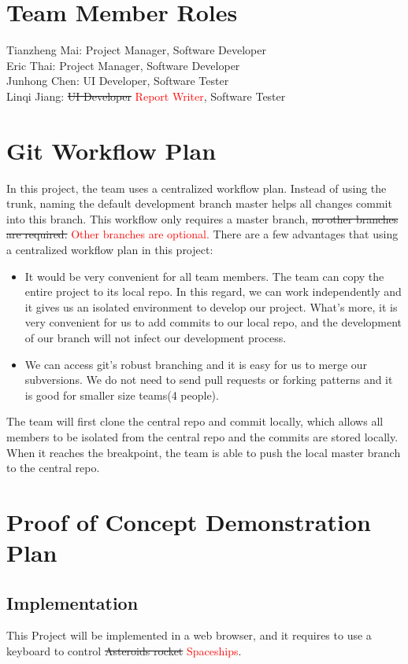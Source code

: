 \documentclass{article}
\begin{document}
\section{Team Member Roles}
Tianzheng Mai: Project Manager, Software Developer\\
Eric Thai: Project Manager, Software Developer\\
Junhong Chen: UI Developer, Software Tester\\
Linqi Jiang: \sout{UI Developer} \textcolor{red}{Report Writer}, Software Tester\\

\section{Git Workflow Plan}
In this project, the team uses a centralized workflow plan. Instead of using the trunk, naming the default development branch master helps all changes commit into this branch. This workflow only requires a master branch, \sout{no other branches are required.} \textcolor{red}{Other branches are optional.}  There are a few advantages that using a centralized workflow plan in this project:

\begin{itemize}
  \item It would be very convenient for all team members. The team can copy the entire project to its local repo. In this regard, we can work independently and it gives us an isolated environment to develop our project. What's more, it is very convenient for us to add commits to our local repo, and the development of our branch will not infect our development process.
  \item We can access git's robust branching and it is easy for us to merge our subversions. We do not need to send pull requests or forking patterns and it is good for smaller size teams(4 people).
\end{itemize}

The team will first clone the central repo and commit locally, which allows all members to be isolated from the central repo and the commits are stored locally. When it reaches the breakpoint, the team is able to push the local master branch to the central repo.
\section{Proof of Concept Demonstration Plan}
\subsection{Implementation}
This Project will be implemented in a web browser, and it requires to use a keyboard to control \sout{Asteroids rocket} \textcolor{red}{Spaceships}.
\end{document}
